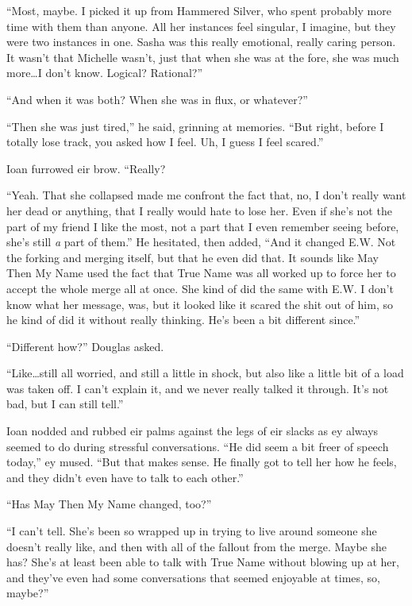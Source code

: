 ``Most, maybe. I picked it up from Hammered Silver, who spent probably more time with them than anyone. All her instances feel singular, I imagine, but they were two instances in one. Sasha was this really emotional, really caring person. It wasn't that Michelle wasn't, just that when she was at the fore, she was much more\ldots I don't know. Logical? Rational?''

``And when it was both? When she was in flux, or whatever?''

``Then she was just tired,'' he said, grinning at memories. ``But right, before I totally lose track, you asked how I feel. Uh, I guess I feel scared.''

Ioan furrowed eir brow. ``Really?

``Yeah. That she collapsed made me confront the fact that, no, I don't really want her dead or anything, that I really would hate to lose her. Even if she's not the part of my friend I like the most, not a part that I even remember seeing before, she's still \emph{a} part of them.'' He hesitated, then added, ``And it changed E.W. Not the forking and merging itself, but that he even did that. It sounds like May Then My Name used the fact that True Name was all worked up to force her to accept the whole merge all at once. She kind of did the same with E.W. I don't know what her message, was, but it looked like it scared the shit out of him, so he kind of did it without really thinking. He's been a bit different since.''

``Different how?'' Douglas asked.

``Like\ldots still all worried, and still a little in shock, but also like a little bit of a load was taken off. I can't explain it, and we never really talked it through. It's not bad, but I can still tell.''

Ioan nodded and rubbed eir palms against the legs of eir slacks as ey always seemed to do during stressful conversations. ``He did seem a bit freer of speech today,'' ey mused. ``But that makes sense. He finally got to tell her how he feels, and they didn't even have to talk to each other.''

``Has May Then My Name changed, too?''

``I can't tell. She's been so wrapped up in trying to live around someone she doesn't really like, and then with all of the fallout from the merge. Maybe she has? She's at least been able to talk with True Name without blowing up at her, and they've even had some conversations that seemed enjoyable at times, so, maybe?''


